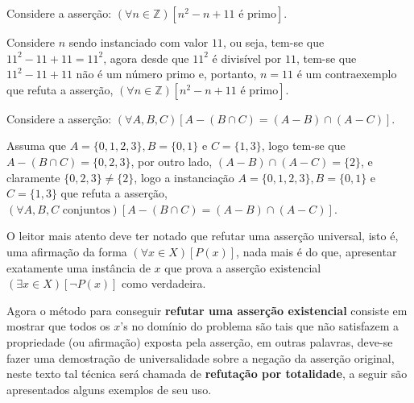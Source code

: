 \begin{exemplo}\label{exe:Refutacao2}
	Considere a asserção: $(\forall n \in \mathbb{Z})[n^2 -n + 11 \text{ é primo}]$.
	
	\begin{refute}
		Considere $n$ sendo instanciado com valor $11$, ou seja, tem-se que $11^2 - 11 + 11 = 11^2$, agora desde que $11^2$ é divisível por $11$, tem-se que $11^2 - 11 + 11$ não é um número primo e, portanto, $n = 11$ é um contraexemplo que refuta a asserção, $(\forall n \in \mathbb{Z})[n^2 -n + 11 \text{ é primo}]$.
	\end{refute}
\end{exemplo}

\begin{exemplo}\label{exe:Refutacao3}
	Considere a asserção: $(\forall A, B, C)[A - (B \cap C) = (A - B) \cap (A - C)]$.
	
	\begin{refute}
		Assuma que $A = \{0, 1, 2, 3\}, B = \{0, 1\}$ e $C = \{1, 3\}$, logo tem-se que $A - (B \cap C) = \{0, 2, 3\}$, por outro lado, $(A - B) \cap (A - C) = \{2\}$, e claramente $\{0, 2, 3\} \neq \{2\}$, logo a instanciação $A = \{0, 1, 2, 3\}, B = \{0, 1\}$ e $C = \{1, 3\}$ que refuta a asserção, $(\forall A, B, C \text{ conjuntos})[A - (B \cap C) = (A - B) \cap (A - C)]$.
	\end{refute}
\end{exemplo}

O leitor mais atento deve ter notado que refutar uma asserção universal, isto é, uma afirmação da forma $(\forall x \in X)[P(x)]$, nada mais é do que, apresentar exatamente uma instância de $x$ que prova a asserção existencial $(\exists x \in X)[\neg P(x)]$ como verdadeira.

Agora o método para conseguir \textbf{refutar uma asserção existencial} consiste em mostrar que todos os $x$'s no domínio do problema são tais que não satisfazem a propriedade (ou afirmação) exposta pela asserção, em outras palavras, deve-se fazer uma demostração de universalidade sobre a negação da asserção original, neste texto tal técnica será chamada de \textbf{refutação por totalidade}, a seguir são apresentados alguns exemplos de seu uso.

